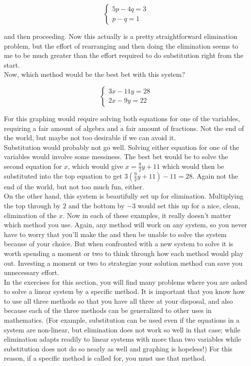 $$\begin{cases}5p-4q=3\\p-q=1 \end{cases}$$

and then proceeding. Now this actually is a pretty straightforward elimination problem, but the effort of rearranging and then doing the elimination seems to me to be much greater than the effort required to do substitution right from the start.\\

Now, which method would be the best bet with this system?

$$\begin{cases}3x-11y=28\\2x-9y=22\end{cases}$$

For this graphing would require solving both equations for one of the variables, requiring a fair amount of algebra and a fair amount of fractions. Not the end of the world, but maybe not too desirable if we can avoid it.\\

Substitution would probably not go well. Solving either equation for one of the variables would involve some messiness. The best bet would be to solve the second equation for $x$, which would give $x=\frac{9}{2}y+11$ which would then be substituted into the top equation to get $3(\frac{9}{2}y+11)-11=28$. Again not the end of the world, but not too much fun, either.\\

On the other hand, this system is beautifully set up for elimination. Multiplying the top through by $2$ and the bottom by $-3$ would set this up for a nice, clean, elimination of the $x$.  Now in each of these examples, it really doesn’t matter which method you use. Again, any method will work on any system, so you never have to worry that you’ll make the  and then be unable to solve the system because of your choice. But when confronted with a new system to solve it is worth spending a moment or two to think through how each method would play out.  Investing a moment or two to strategize your solution method can save you unnecessary effort. \\

In the exercises for this section, you will find many problems where you are asked to solve a linear system by a specific method. It is important that you know how to use all three methods so that you have all three at your disposal, and also because each of the three methods can be generalized to other uses in mathematics. (For example, substitution can be used even if the equations in a system are non-linear, but elimination does not work so well in that case; while elimination adapts readily to linear systems with more than two variables while substitution does not do so nearly as well and graphing is hopeless!) For this reason, if a specific method is called for, you must use that method.\\

